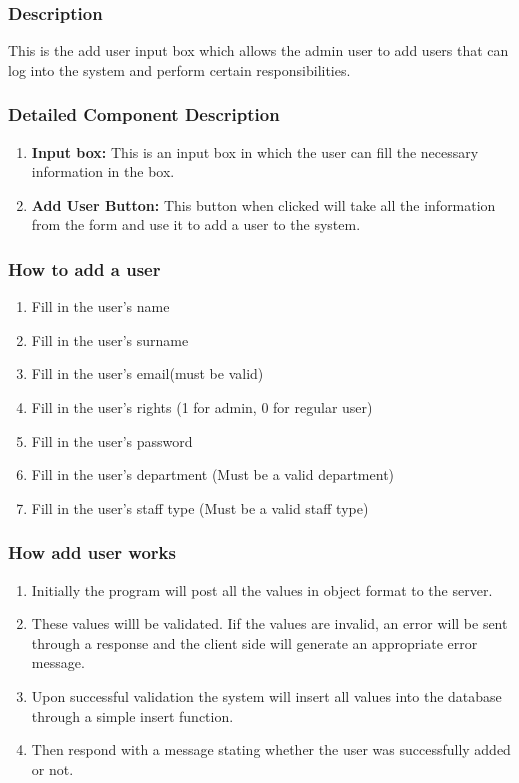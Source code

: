 \documentclass[14pt, a4paper]{article}
\begin{document}
	\subsubsection{Description} This is the add user input box which allows the admin user to add users that can log into the system and perform certain responsibilities.
	\subsubsection{Detailed Component Description}
		\begin{enumerate}
			\item \textbf{Input box:} This is an input box in which the user can fill the necessary information in the box.
			\item \textbf{Add User Button:} This button when clicked will take all the information from the form and use it to add a user to the system.
		\end{enumerate}
	\subsubsection{How to add a user}
		\begin{enumerate}
			\item Fill in the user's name
			\item Fill in the user's surname
			\item Fill in the user's email(must be valid)
			\item Fill in the user's rights (1 for admin, 0 for regular user)
			\item Fill in the user's password
			\item Fill in the user's department (Must be a valid department)
			\item Fill in the user's staff type (Must be a valid staff type)
		\end{enumerate}
	\subsubsection{How add user works}
		\begin{enumerate}
			\item Initially the program will post all the values in object format to the server. 
			\item These values willl be validated. Iif the values are invalid,  an error will be sent through a response and the client side will generate an appropriate error message.
			\item Upon successful validation the system will insert all values into the database through a simple insert function.
			\item Then respond with a message stating whether the user was successfully added or not.
		\end{enumerate}
\end{document}
